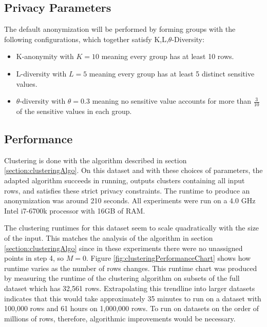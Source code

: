 \subsection{Privacy Parameters}
The default anonymization will be performed by forming groups with the following configurations, which together satisfy K,L,$\theta$-Diversity:
\begin{itemize}
    \item K-anonymity with $K=10$ meaning every group has at least 10 rows.
    \item L-diversity with $L=5$ meaning every group has at least 5 distinct sensitive values.
    \item $\theta$-diversity with $\theta=0.3$ meaning no sensitive value accounts for more than $\frac{3}{10}$ of the sensitive values in each group.
\end{itemize}

\subsection{Performance}
Clustering is done with the algorithm described in section \ref{section:clusteringAlgo}. On this dataset and with these choices of parameters, the adapted algorithm succeeds in running, outputs clusters containing all input rows, and satisfies these strict privacy constraints. The runtime to produce an anonymization was around 210 seconds. All experiments were run on a 4.0 GHz Intel i7-6700k processor with 16GB of RAM. 

The clustering runtimes for this dataset seem to scale quadratically with the size of the input. This matches the analysis of the algorithm in section \ref{section:clusteringAlgo} since in these experiments there were no unassigned points in step 4, so $M=0$. Figure \ref{fig:clusteringPerformanceChart} shows how runtime varies as the number of rows changes. This runtime chart was produced by measuring the runtime of the clustering algorithm on subsets of the full dataset which has 32,561 rows. Extrapolating this trendline into larger datasets indicates that this would take approximately 35 minutes to run on a dataset with 100,000 rows and 61 hours on 1,000,000 rows. To run on datasets on the order of millions of rows, therefore, algorithmic improvements would be necessary.

\begin{figure*}
  \centering
  
  \caption{Clustering Performance}
  \label{fig:clusteringPerformanceChart}
\end{figure*}

